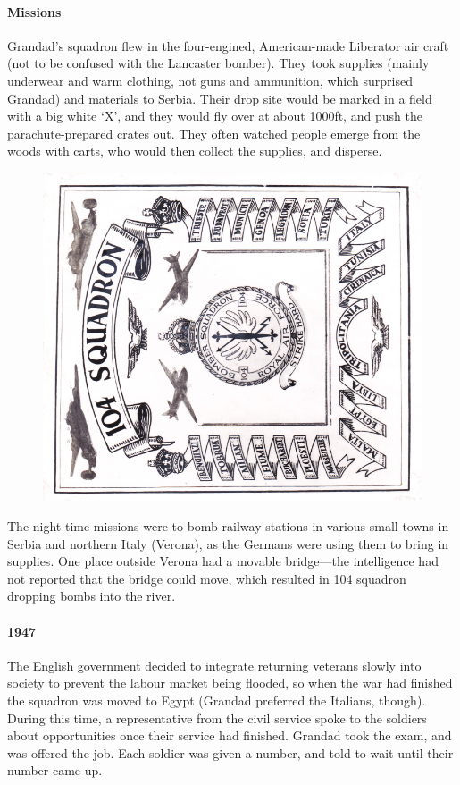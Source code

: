 \paragraph{Missions} Grandad's squadron flew in the four-engined, American-made Liberator air craft (not to be
confused with the Lancaster bomber). They
took supplies (mainly underwear and warm clothing, not guns and ammunition, which surprised Grandad)
and materials to Serbia. Their drop site would
be marked in a field with a big white `X', and they would fly over at about 1000ft, and push
the parachute-prepared crates out. They often watched people emerge from the woods with carts,
who would then collect the supplies, and disperse.

\begin{figure}
	\centering
	\includegraphics[width=.7\textwidth,trim={.15cm 0cm 0 0cm},clip]{squadron104}
\end{figure}
The night-time missions were to bomb railway stations in various small towns in Serbia and northern Italy (Verona),
as the Germans were using them to bring in supplies. One place outside Verona had a movable bridge---the
intelligence had not reported that the bridge could move, which resulted in 104 squadron dropping bombs into
the river.

\paragraph{1947} The English government
decided to integrate returning veterans slowly into society to prevent the labour market being
flooded, so when the war had finished the squadron was moved to Egypt (Grandad preferred the Italians, though).
During this time, a
representative from the civil service spoke to the soldiers about opportunities once their
service had finished. Grandad took the exam, and was offered the job. Each soldier was given
a number, and told to wait until their number came up.

